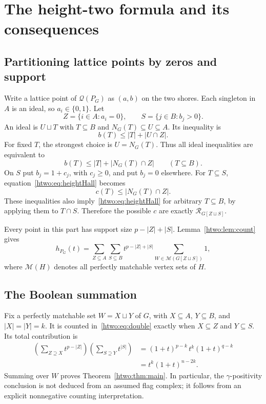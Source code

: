 \documentclass[11pt]{article}
\numberwithin{equation}{section}
\theoremstyle{definition}
\newcommand{\PM}{\mathcal M}
\begin{document}
\section{The height-two formula and its consequences}\label{htwo:sec:gamma}

\subsection{Partitioning lattice points by zeros and support}

Write a lattice point of $\mathcal Q(P_G)$ as $(a,b)$ on the two shores.
Each singleton in $A$ is an ideal, so $a_i\in\{0,1\}$. Let
\[
 Z=\{i\in A:a_i=0\},\qquad S=\{j\in B:b_j>0\}.
\]
An ideal is $U\sqcup T$ with $T\subseteq B$ and $N_G(T)\subseteq U\subseteq A$.
Its inequality is
\[
 b(T)\le |T|+|U\cap Z|.
\]
For fixed $T$, the strongest choice is $U=N_G(T)$. Thus all ideal
inequalities are equivalent to
\begin{equation}
 b(T)\le |T|+|N_G(T)\cap Z|\qquad(T\subseteq B).\label{htwo:eq:heightHall}
\end{equation}
On $S$ put $b_j=1+c_j$, with $c_j\ge0$, and put $b_j=0$ elsewhere.
For $T\subseteq S$, equation~\eqref{htwo:eq:heightHall} becomes
\[
 c(T)\le|N_G(T)\cap Z|.
\]
These inequalities also imply~\eqref{htwo:eq:heightHall} for arbitrary
$T\subseteq B$, by applying them to $T\cap S$. Therefore the possible
$c$ are exactly $\mathcal R_{G[Z\sqcup S]}$.

Every point in this part has support size $p-|Z|+|S|$. Lemma~\ref{htwo:lem:count}
gives
\begin{equation}
 h_{P_G}(t)=\sum_{Z\subseteq A}\sum_{S\subseteq B}
 t^{p-|Z|+|S|}
 \sum_{W\in\PM(G[Z\sqcup S])}1,\label{htwo:eq:double}
\end{equation}
where $\PM(H)$ denotes all perfectly matchable vertex sets of $H$.

\subsection{The Boolean summation}

Fix a perfectly matchable set $W=X\sqcup Y$ of $G$, with $X\subseteq A$,
$Y\subseteq B$, and $|X|=|Y|=k$. It is counted in~\eqref{htwo:eq:double} exactly
when $X\subseteq Z$ and $Y\subseteq S$. Its total contribution is
\begin{align*}
 \left(\sum_{Z\supseteq X}t^{p-|Z|}\right)
 \left(\sum_{S\supseteq Y}t^{|S|}\right)
 &=(1+t)^{p-k}\,t^k(1+t)^{q-k}\\
 &=t^k(1+t)^{n-2k}.
\end{align*}
Summing over $W$ proves Theorem~\ref{htwo:thm:main}. In particular, the
$\gamma$-positivity conclusion is not deduced from an assumed flag complex;
it follows from an explicit nonnegative counting interpretation.
\end{document}
